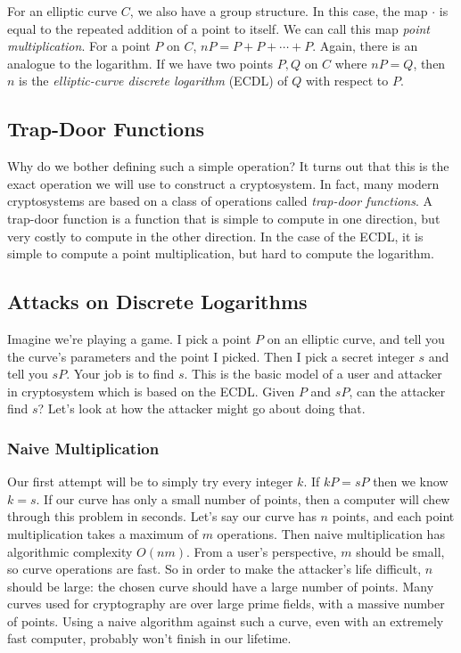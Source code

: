 \documentclass{article}
\begin{document}
For an elliptic curve $C$, we also have a group structure. 
In this case, the map $\cdot$ is equal to the repeated addition of a point to itself. 
We can call this map \textit{point multiplication}.
For a point $P$ on $C$, $nP = P + P + \cdots + P$.
Again, there is an analogue to the logarithm.
If we have two points $P,Q$ on $C$ where $nP = Q$, then $n$ is the \textit{elliptic-curve discrete logarithm} (ECDL) of $Q$ with respect to $P$.

\subsection{Trap-Door Functions}
Why do we bother defining such a simple operation?
It turns out that this is the exact operation we will use to construct a cryptosystem.
In fact, many modern cryptosystems are based on a class of operations called \textit{trap-door functions}.
A trap-door function is a function that is simple to compute in one direction, but very costly to compute in the other direction.
In the case of the ECDL, it is simple to compute a point multiplication, but hard to compute the logarithm.

\subsection{Attacks on Discrete Logarithms}
Imagine we're playing a game.
I pick a point $P$ on an elliptic curve, and tell you the curve's parameters and the point I picked.
Then I pick a secret integer $s$ and tell you $sP$. Your job is to find $s$.
This is the basic model of a user and attacker in cryptosystem which is based on the ECDL.
Given $P$ and $sP$, can the attacker find $s$? Let's look at how the attacker might go about doing that.

\subsubsection{Naive Multiplication}
Our first attempt will be to simply try every integer $k$.
If $kP = sP$ then we know $k = s$.
If our curve has only a small number of points, then a computer will chew through this problem in seconds.
Let's say our curve has $n$ points, and each point multiplication takes a maximum of $m$ operations.
Then naive multiplication has algorithmic complexity $O(nm)$.
From a user's perspective, $m$ should be small, so curve operations are fast.
So in order to make the attacker's life difficult, $n$ should be large: the chosen curve should have a large number of points.
Many curves used for cryptography are over large prime fields, with a massive number of points.
Using a naive algorithm against such a curve, even with an extremely fast computer, probably won't finish in our lifetime.
\end{document}
